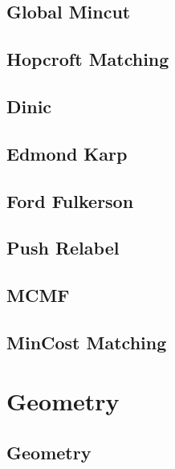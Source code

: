 \subsection{Global Mincut}
\raggedbottom
\hrulefill
\subsection{Hopcroft Matching}
\raggedbottom
\hrulefill
\subsection{Dinic}
\raggedbottom
\hrulefill
\subsection{Edmond Karp}
\raggedbottom
\hrulefill
\subsection{Ford Fulkerson}
\raggedbottom
\hrulefill
\subsection{Push Relabel}
\raggedbottom
\hrulefill
\subsection{MCMF}
\raggedbottom
\hrulefill
\subsection{MinCost Matching}
\raggedbottom
\hrulefill

\section{Geometry}
\subsection{Geometry}
\raggedbottom
\hrulefill
